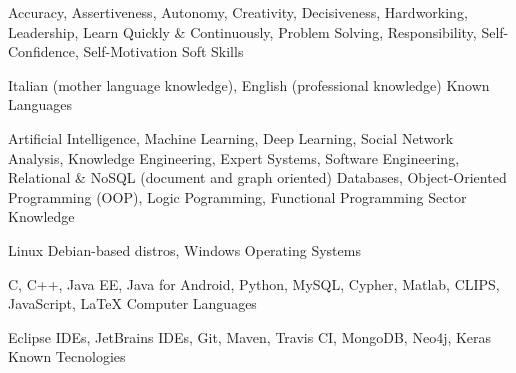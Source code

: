 

\begin{cventries}

  \cventry
      {Accuracy, Assertiveness, Autonomy, Creativity, Decisiveness, Hardworking, Leadership, Learn Quickly \& Continuously, Problem Solving, Responsibility, Self-Confidence, Self-Motivation}
    {Soft Skills}
    {}
    {}
    {}

  \cventry
    {Italian (mother language knowledge), English (professional knowledge)}
    {Known Languages}
    {}
    {}
    {}

  \cventry
    {Artificial Intelligence, Machine Learning, Deep Learning, Social Network Analysis, Knowledge Engineering, Expert Systems, Software Engineering, Relational \& NoSQL (document and graph oriented) Databases, Object-Oriented Programming (OOP), Logic Pogramming, Functional Programming}
    {Sector Knowledge}
    {}
    {}
    {}

  \cventry
    {Linux Debian-based distros, Windows}
    {Operating Systems}
    {}
    {}
    {}

  \cventry
    {C, C++, Java EE, Java for Android, Python, MySQL, Cypher, Matlab, CLIPS, JavaScript, LaTeX}
    {Computer Languages}
    {}
    {}
    {}

  \cventry
    {Eclipse IDEs, JetBrains IDEs, Git, Maven, Travis CI, MongoDB, Neo4j, Keras}
    {Known Tecnologies}
    {}
    {}
    {}

\end{cventries}

